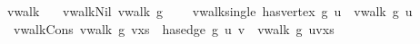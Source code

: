 \isamarkupfalse%
\ vwalk\ \isanewline
\ \ vwalk{\isacharunderscore}{\kern0pt}Nil{\isacharcolon}{\kern0pt}\ {\isachardoublequoteopen}vwalk\ g\ {\isacharbrackleft}{\kern0pt}{\isacharbrackright}{\kern0pt}{\isachardoublequoteclose}\ {\isacharbar}{\kern0pt}\isanewline
\ \ vwalk{\isacharunderscore}{\kern0pt}single{\isacharcolon}{\kern0pt}\ {\isachardoublequoteopen}has{\isacharunderscore}{\kern0pt}vertex\ g\ u\ {\isasymLongrightarrow}\ vwalk\ g\ {\isacharbrackleft}{\kern0pt}u{\isacharbrackright}{\kern0pt}{\isachardoublequoteclose}\ {\isacharbar}{\kern0pt}\isanewline
\ \ vwalk{\isacharunderscore}{\kern0pt}Cons{\isacharcolon}{\kern0pt}\ {\isachardoublequoteopen}vwalk\ g\ {\isacharparenleft}{\kern0pt}v{\isacharhash}{\kern0pt}xs{\isacharparenright}{\kern0pt}\ {\isasymLongrightarrow}\ has{\isacharunderscore}{\kern0pt}edge\ g\ u\ v\ {\isasymLongrightarrow}\ vwalk\ g\ {\isacharparenleft}{\kern0pt}u{\isacharhash}{\kern0pt}v{\isacharhash}{\kern0pt}xs{\isacharparenright}{\kern0pt}{\isachardoublequoteclose}\isanewline
